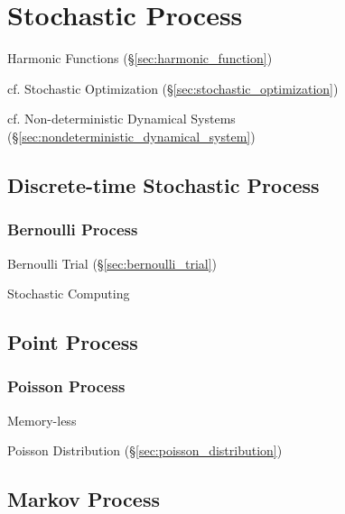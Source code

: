 \section{Stochastic Process}\label{sec:stochastic_process}

Harmonic Functions (\S\ref{sec:harmonic_function})

\fist cf. Stochastic Optimization (\S\ref{sec:stochastic_optimization})

\fist cf. Non-deterministic Dynamical Systems
(\S\ref{sec:nondeterministic_dynamical_system})



\subsection{Discrete-time Stochastic Process}
\label{sec:discretetime_stochastic}

\subsubsection{Bernoulli Process}\label{sec:bernoulli_process}

Bernoulli Trial (\S\ref{sec:bernoulli_trial})

Stochastic Computing



\subsection{Point Process}\label{sec:point_process}

\subsubsection{Poisson Process}\label{sec:poisson_process}

Memory-less

Poisson Distribution (\S\ref{sec:poisson_distribution})



\subsection{Markov Process}\label{sec:markov_process}

